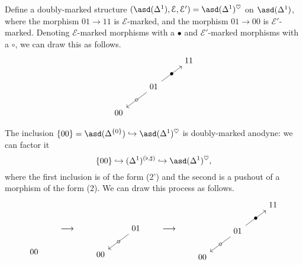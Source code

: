 \documentclass[main.tex]{subfiles}
\begin{document}
\begin{example}
  \label{eg:bimarking_on_asd_delta1}
  Define a doubly-marked structure $(\asd(\Delta^{1}), \mathcal{E}, \mathcal{E}') = \asd(\Delta^{1})^{\heartsuit}$ on $\asd(\Delta^{1})$, where the morphism $01 \to 11$ is $\mathcal{E}$-marked, and the morphism $01 \to 00$ is $\mathcal{E}'$-marked. Denoting $\mathcal{E}$-marked morphisms with a $\bullet$ and $\mathcal{E}'$-marked morphisms with a $\circ$, we can draw this as follows.
  \begin{equation*}
    \begin{tikzcd}
      && 11
      \\
      & 01
      \arrow[ur, "\bullet" marking]
      \arrow[dl, "\circ" marking]
      \\
      00
    \end{tikzcd}
  \end{equation*}

  The inclusion $\{00\} = \asd(\Delta^{\{0\}}) \hookrightarrow \asd(\Delta^{1})^{\heartsuit}$ is doubly-marked anodyne: we can factor it
  \begin{equation*}
    \{00\} \hookrightarrow (\Delta^{1})^{(\flat, \sharp)} \hookrightarrow \asd(\Delta^{1})^{\heartsuit},
  \end{equation*}
  where the first inclusion is of the form (2') and the second is a pushout of a morphism of the form (2). We can draw this process as follows.
  \begin{equation*}
    \begin{tikzcd}
      \
      \\
      \
      \\
      00
    \end{tikzcd}
    \qquad\longrightarrow\qquad
    \begin{tikzcd}
      & \
      \\
      & 01
      \arrow[dl, "\circ" marking]
      \\
      00
    \end{tikzcd}
    \qquad\longrightarrow\qquad
    \begin{tikzcd}
      && 11
      \\
      & 01
      \arrow[ur, "\bullet" marking]
      \arrow[dl, "\circ" marking]
      \\
      00
    \end{tikzcd}
  \end{equation*}
\end{example}
\end{document}
